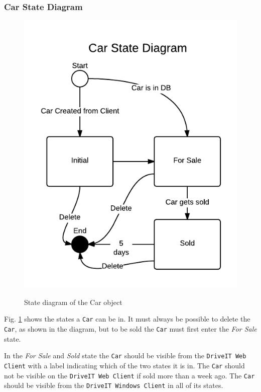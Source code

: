 \subsubsection{Car State Diagram}
\begin{figure}[H]
	\centering
		\includegraphics[width=\textwidth]{Figures/StateDiagram-Car}\\
	\caption{State diagram of the Car object}
  \label{fig:StateDiagram-Car}
\end{figure}
Fig. \ref{fig:StateDiagram-Car} shows the states a \texttt{Car} can be in. It must always be possible to delete the \texttt{Car}, as shown in the diagram, but to be sold the \texttt{Car} must first enter the \textit{For Sale} state. 

In the \textit{For Sale} and \textit{Sold} state the \texttt{Car} should be visible from the \texttt{DriveIT Web Client} with a label indicating which of the two states it is in. The \texttt{Car} should not be visible on the \texttt{DriveIT Web Client} if sold more than a week ago. The \texttt{Car} should be visible from the \texttt{DriveIT Windows Client} in all of its states.\\